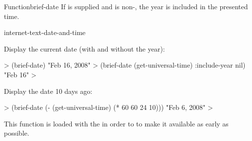 \documentclass[10pt,twoside,english,pdftex]{article}
\begin{document}
\begin{functiondoc}{Function}{brief-date}
\W{} 
%
If  is supplied and is non-\nil, the year is included in
the presented time.

\begin{alsos}{internet-text-date-and-time}
\end{alsos}

\fnexamples
Display the current date (with and without the year):
%
\W\supp
\begin{example}
  > (brief-date)
  "Feb 16, 2008"
  > (brief-date (get-universal-time) :include-year nil)
  "Feb 16"
  >
\end{example}
%
Display the date 10 days ago:
%
\W\supp\notpretop
\begin{example}
  > (brief-date (- (get-universal-time) (* 60 60 24 10)))
  "Feb 6, 2008"
  >
\end{example}

\fnnote
{}%
%
%
This function is loaded with the  
in order to to make it available as early as possible.

\end{functiondoc}

\end{document}
